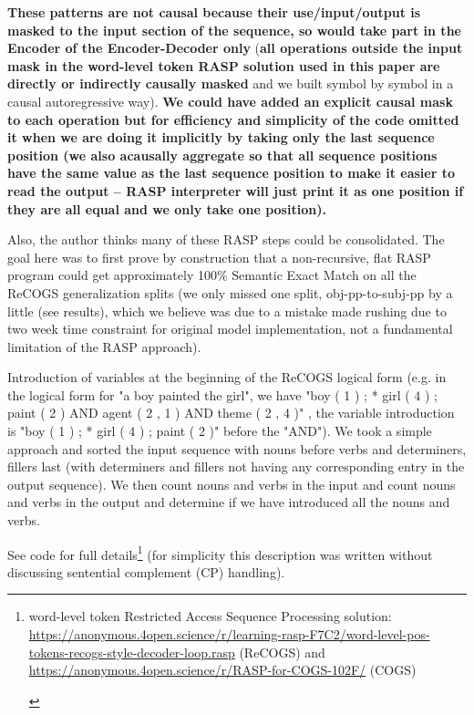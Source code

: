 \documentclass[11pt]{article}
\begin{document}
\textbf{These patterns are not causal because their use/input/output is masked to the input section of the sequence, so would take part in the Encoder of the Encoder-Decoder only} (\textbf{all operations outside the input mask in the word-level token RASP solution used in this paper are directly or indirectly causally masked} and we built symbol by symbol in a causal autoregressive way). \textbf{We could have added an explicit causal mask to each operation but for efficiency and simplicity of the code omitted it when we are doing it implicitly by taking only the last sequence position (we also acausally aggregate so that all sequence positions have the same value as the last sequence position to make it easier to read the output -- RASP interpreter will just print it as one position if they are all equal and we only take one position).}

Also, the author thinks many of these RASP steps could be consolidated. The goal here was to first prove by construction that a non-recursive, flat RASP program could get approximately 100\% Semantic Exact Match on all the ReCOGS generalization splits (we only missed one split, obj-pp-to-subj-pp by a little (see results), which we believe was due to a mistake made rushing due to two week time constraint for original model implementation, not a fundamental limitation of the RASP approach).

Introduction of variables at the beginning of the ReCOGS logical form (e.g. in the logical form for "a boy painted the girl", we have "boy ( 1 ) ; * girl ( 4 ) ; paint ( 2 ) AND agent ( 2 , 1 ) AND theme ( 2 , 4 )" , the variable introduction is "boy ( 1 ) ; * girl ( 4 ) ; paint ( 2 )" before the "AND"). We took a simple approach and sorted the input sequence with nouns before verbs and determiners, fillers last (with determiners and fillers not having any corresponding entry in the output sequence). We then count nouns and verbs in the input and count nouns and verbs in the output and determine if we have introduced all the nouns and verbs.

See code for full details\footnote{\begin{footnotesize}word-level token Restricted Access Sequence Processing solution: \href{https://anonymous.4open.science/r/learning-rasp-F7C2/word-level-pos-tokens-recogs-style-decoder-loop.rasp}{https://anonymous.4open.science/r/learning-rasp-F7C2/word-level-pos-tokens-recogs-style-decoder-loop.rasp} (ReCOGS) and \href{https://anonymous.4open.science/r/RASP-for-COGS-102F/}{https://anonymous.4open.science/r/RASP-for-COGS-102F/} (COGS)\end{footnotesize}} (for simplicity this description was written without discussing sentential complement (CP) handling).
\end{document}
